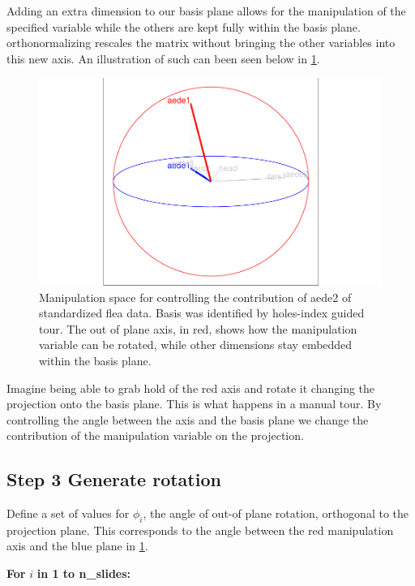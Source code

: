 \documentclass{monashthesis}
\begin{document}
Adding an extra dimension to our basis plane allows for the manipulation of the specified variable while the others are kept fully within the basis plane. orthonormalizing rescales the matrix without bringing the other variables into this new axis. An illustration of such can been seen below in \ref{fig:step2}.

\begin{figure}
\centering
\includegraphics{thesis_files/figure-latex/step2-1.pdf}
\caption{\label{fig:step2}Manipulation space for controlling the contribution of aede2 of standardized flea data. Basis was identified by holes-index guided tour. The out of plane axis, in red, shows how the manipulation variable can be rotated, while other dimensions stay embedded within the basis plane.}
\end{figure}

Imagine being able to grab hold of the red axis and rotate it changing the projection onto the basis plane. This is what happens in a manual tour. By controlling the angle between the axis and the basis plane we change the contribution of the manipulation variable on the projection.

\hypertarget{step-3-generate-rotation}{%
\subsection{Step 3 Generate rotation}\label{step-3-generate-rotation}}

Define a set of values for \(\phi_i\), the angle of out-of plane rotation, orthogonal to the projection plane. This corresponds to the angle between the red manipulation axis and the blue plane in \ref{fig:step2}.

\textbf{For } \(i\) \textbf{in 1 to n\_slides:}
\end{document}
